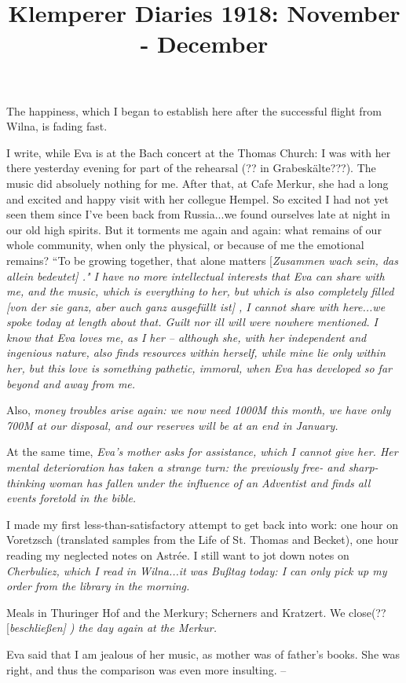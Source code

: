 \documentclass{article}
\title{Klemperer Diaries 1918: November - December}
\newcommand{\WTF}[1]{
[\it{\small{#1}}]
}
\begin{document}

The happiness, which I began to establish here after the successful flight from Wilna, is fading fast.

I write, while Eva is at the Bach concert at the Thomas Church: I was with her there yesterday evening for part of the rehearsal (?? in Grabeskälte???). The music did absoluely nothing for me. After that, at Cafe Merkur, she had a long and excited and happy visit with her collegue Hempel. So excited I had not yet seen them since I've been back from Russia...we found ourselves late at night in our old high spirits. But it torments me again and again: what remains of our whole community, when only the physical, or because of me the emotional remains? “To be growing together, that alone matters\WTF{Zusammen wach sein, das allein bedeutet}." I have no more intellectual interests that Eva can share with me, and the music, which is everything to her, but which is also completely filled\WTF{von der sie ganz, aber auch ganz ausgefüllt ist}, I cannot share with here...we spoke today at length about that. Guilt nor ill will were nowhere mentioned. I know that Eva loves me, as I her -- although she, with her independent and ingenious nature, also finds resources within herself, while mine lie only within her, but this love is something pathetic, immoral, when Eva has developed so far beyond and away from me.

Also, \it{money troubles} arise again: we now need 1000M this month, we have only 700M at our disposal, and our reserves will be at an end in January.

At the same time, \it{Eva's mother} asks for assistance, which I cannot give her. Her mental deterioration has taken a strange turn: the previously free- and sharp-thinking woman has fallen under the influence of an Adventist and finds all events foretold in the bible.

I made my first less-than-satisfactory attempt to get back into work: one hour on Voretzsch (translated samples from the Life of St. Thomas and Becket), one hour reading my neglected notes on Astrée. I still want to jot down notes on \it{Cherbuliez}, which I read in Wilna...it was Bußtag today: I can only pick up my order from the library in the morning.

Meals in Thuringer Hof and the Merkury; Scherners and Kratzert. We close(??\WTF{beschließen}) the day again at the Merkur.

Eva said that I am jealous of her music, as mother was of father's books. She was right, and thus the comparison was even more insulting. --
\end{document}
